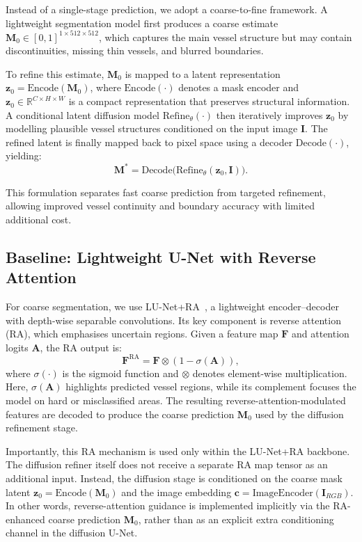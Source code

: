 \documentclass[journal,article,submit,pdftex,moreauthors]{Definitions/mdpi}
\begin{document}
Instead of a single-stage prediction, we adopt a coarse-to-fine framework. A lightweight segmentation model first produces a coarse estimate $\mathbf{M}_0\in[0,1]^{1\times512\times512}$, which captures the main vessel structure but may contain discontinuities, missing thin vessels, and blurred boundaries.

To refine this estimate, $\mathbf{M}_0$ is mapped to a latent representation $\mathbf{z}_0=\mathrm{Encode}(\mathbf{M}_0)$, where $\mathrm{Encode}(\cdot)$ denotes a mask encoder and $\mathbf{z}_0\in\mathbb{R}^{C\times H\times W}$ is a compact representation that preserves structural information. A conditional latent diffusion model $\mathrm{Refine}_{\theta}(\cdot)$ then iteratively improves $\mathbf{z}_0$ by modelling plausible vessel structures conditioned on the input image $\mathbf{I}$. The refined latent is finally mapped back to pixel space using a decoder $\mathrm{Decode}(\cdot)$, yielding:
\begin{equation}
\mathbf{M}^* = \mathrm{Decode}\big(\mathrm{Refine}_{\theta}(\mathbf{z}_0, \mathbf{I})\big).
\end{equation}

This formulation separates fast coarse prediction from targeted refinement, allowing improved vessel continuity and boundary accuracy with limited additional cost.

\subsection{Baseline: Lightweight U-Net with Reverse Attention}

For coarse segmentation, we use LU-Net+RA~\cite{Hernandez2025}, a lightweight encoder--decoder with depth-wise separable convolutions. Its key component is reverse attention (RA), which emphasises uncertain regions. Given a feature map $\mathbf{F}$ and attention logits $\mathbf{A}$, the RA output is:
\begin{equation}
\mathbf{F}^{\text{RA}} = \mathbf{F}\otimes \left(1-\sigma(\mathbf{A})\right),
\end{equation}
where $\sigma(\cdot)$ is the sigmoid function and $\otimes$ denotes element-wise multiplication. Here, $\sigma(\mathbf{A})$ highlights predicted vessel regions, while its complement focuses the model on hard or misclassified areas. The resulting reverse-attention-modulated features are decoded to produce the coarse prediction $\mathbf{M}_0$ used by the diffusion refinement stage.

Importantly, this RA mechanism is used only within the LU-Net+RA backbone. The diffusion refiner itself does not receive a separate RA map tensor as an additional input. Instead, the diffusion stage is conditioned on the coarse mask latent $\mathbf{z}_0=\mathrm{Encode}(\mathbf{M}_0)$ and the image embedding $\mathbf{c}=\mathrm{ImageEncoder}(\mathbf{I}_{RGB})$. In other words, reverse-attention guidance is implemented implicitly via the RA-enhanced coarse prediction $\mathbf{M}_0$, rather than as an explicit extra conditioning channel in the diffusion U-Net.
\end{document}
